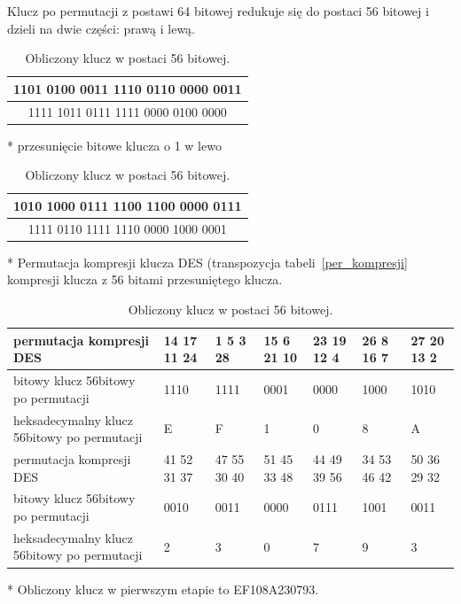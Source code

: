 \documentclass[12p]{article}
\begin{document}
Klucz po permutacji z postawi 64 bitowej redukuje się do postaci 56 bitowej i dzieli na dwie części: prawą i lewą. 

\begin{table}[H]
\centering
\begin{tabular}{|c|}
\hline
1101 0100 0011 1110 0110 0000 0011\\
\hline
1111 1011 0111 1111 0000 0100 0000\\
\hline
\end{tabular}
\caption{Obliczony klucz w postaci 56 bitowej.}
\end{table}

* przesunięcie bitowe klucza o 1 w lewo
\begin{table}[H]
\centering
\begin{tabular}{|c|}
\hline
1010 1000 0111 1100 1100 0000 0111\\
\hline
1111 0110 1111 1110 0000 1000 0001\\
\hline
\end{tabular}
\caption{Obliczony klucz w postaci 56 bitowej.}
\end{table}

* Permutacja kompresji klucza DES (transpozycja tabeli~\ref{per_kompresji} kompresji klucza z 56 bitami przesuniętego klucza.

\begin{table}[H]
\centering
\begin{tabular}{ | p{3cm} | p{1.7cm} | p{1.7cm} | p{1.7cm} | p{1.7cm} | p{1.7cm} | p{1.7cm} |}
\hline
permutacja kompresji DES & 14 17 11 24  & 1 5 3 28 &  15 6 21 10 & 23  19 12 4 & 26 8 16 7 & 27 20 13 2\\ \hline
bitowy klucz 56bitowy po permutacji & 1110 & 1111 & 0001 & 0000 & 1000 & 1010 \\ \hline
heksadecymalny klucz 56bitowy po permutacji & E & F & 1 & 0 & 8 & A\\
\hline \hline
permutacja kompresji DES & 41 52 31 37 & 47 55 30 40 & 51 45 33 48 & 44 49 39 56 & 34 53 46 42 & 50 36 29 32\\ \hline
bitowy klucz 56bitowy po permutacji & 0010 & 0011 & 0000 & 0111 & 1001 & 0011\\ \hline
heksadecymalny klucz 56bitowy po permutacji & 2 & 3 & 0 & 7 & 9 & 3\\ 
\hline
\end{tabular}
\caption{Obliczony klucz w postaci 56 bitowej.}
\end{table}

* Obliczony klucz w pierwszym etapie to EF108A230793.
\end{document}
